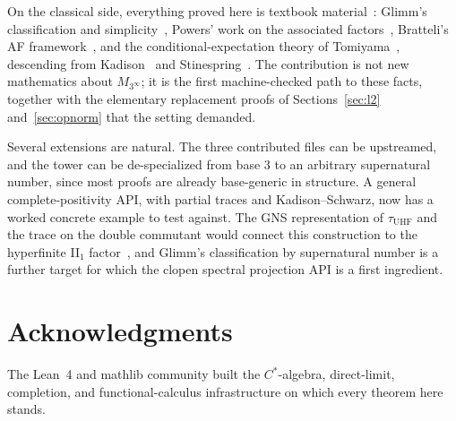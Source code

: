 \documentclass[11pt,reqno]{amsart}
\theoremstyle{plain}
\theoremstyle{definition}
\theoremstyle{remark}
\newcommand{\tuhf}{\tau_{\mathrm{UHF}}}
\begin{document}
On the classical side, everything proved here is textbook
material~\cite{davidson1996, blackadar2006, takesaki1979}: Glimm's
classification and simplicity~\cite{glimm1960}, Powers' work on the
associated factors~\cite{powers1967}, Bratteli's AF
framework~\cite{bratteli1972}, and the conditional-expectation theory of
Tomiyama~\cite{tomiyama1957}, descending from Kadison~\cite{kadison1952}
and Stinespring~\cite{stinespring1955}. The contribution is not new
mathematics about $M_{3^\infty}$; it is the first machine-checked path to
these facts, together with the elementary replacement proofs of
Sections~\ref{sec:l2} and~\ref{sec:opnorm} that the setting demanded.

Several extensions are natural. The three contributed files can be
upstreamed, and the tower can be de-specialized from base $3$ to an
arbitrary supernatural number, since most proofs are already
base-generic in structure. A general complete-positivity API, with partial
traces and Kadison--Schwarz, now has a worked concrete example to test
against. The GNS representation of $\tuhf$ and the trace on the double
commutant would connect this construction to the hyperfinite II$_1$
factor~\cite{murray-vonneumann1936, powers1967}, and Glimm's classification
by supernatural number is a further target for which the clopen spectral
projection API is a first ingredient.

\section*{Acknowledgments}
The Lean~4 and mathlib community built the $C^*$-algebra, direct-limit,
completion, and functional-calculus infrastructure on which every theorem
here stands.
\end{document}
